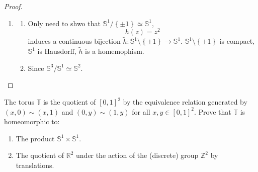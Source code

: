 \documentclass[../main.tex]{subfiles}
\begin{document}
\begin{proof}
\begin{enumerate}
\[        \mathbb{CP}^{n}\simeq  \mathbb{S}^{2n+ 1}/ \mathbb{S}^{1}
        \]    
        \item \begin{enumerate}
            \item Only need to shwo that \(  \mathbb{S}^{1}/\left\{ \pm 1 \right\}\simeq \mathbb{S}^{1}  \), \[
            h\left( z \right)= z^{2} 
            \] induces a continuous bijection \(  \tilde{h}: \mathbb{S}^{1}\setminus \left\{\pm 1 \right\}\to \mathbb{S}^{1}  \). \(  \mathbb{S}^{1}\setminus \left\{ \pm 1 \right\}  \) is compact, \(  \mathbb{S}^{1}  \) is Hausdorff, \(  \tilde{h}  \) is a homemophism.
            \item Since \(  \mathbb{S}^{3}/\mathbb{S}^{1}\simeq \mathbb{S}^{2}  \).        
        \end{enumerate}
        
    \end{enumerate}
    
\end{proof}
\begin{problem}{}{}
    
The torus $\mathbb{T}$ is the quotient of $\left[ 0,1 \right] ^2$ by the equivalence relation generated by $(x,0) \sim (x,1)$ and $(0,y) \sim (1,y)$ for all $x, y \in \left[ 0,1 \right]^{2} $. Prove that $\mathbb{T}$ is homeomorphic to:
\begin{enumerate}
    \item The product $\mathbb{S}^1 \times \mathbb{S}^1$.
    \item The quotient of $\mathbb{R}^2$ under the action of the (discrete) group $\mathbb{Z}^2$ by translations.
\end{enumerate}
\end{problem}
\end{document}
